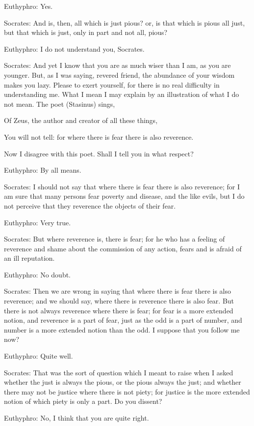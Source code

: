 Euthyphro: Yes.

Socrates: And is, then, all which is just pious? or, is that which is pious all just, but that which is just, only in part and not all, pious?

Euthyphro: I do not understand you, Socrates.

Socrates: And yet I know that you are as much wiser than I am, as you are younger. But, as I was saying, revered friend, the abundance of your wisdom makes you lazy. Please to exert yourself, for there is no real difficulty in understanding me. What I mean I may explain by an illustration of what I do not mean. The poet (Stasinus) sings,

Of Zeus, the author and creator of all these things,

You will not tell: for where there is fear there is also reverence.

Now I disagree with this poet. Shall I tell you in what respect?

Euthyphro: By all means.

Socrates: I should not say that where there is fear there is also reverence; for I am sure that many persons fear poverty and disease, and the like evils, but I do not perceive that they reverence the objects of their fear.

Euthyphro: Very true.

Socrates: But where reverence is, there is fear; for he who has a feeling of reverence and shame about the commission of any action, fears and is afraid of an ill reputation.

Euthyphro: No doubt.

Socrates: Then we are wrong in saying that where there is fear there is also reverence; and we should say, where there is reverence there is also fear. But there is not always reverence where there is fear; for fear is a more extended notion, and reverence is a part of fear, just as the odd is a part of number, and number is a more extended notion than the odd. I suppose that you follow me now?

Euthyphro: Quite well.

Socrates: That was the sort of question which I meant to raise when I asked whether the just is always the pious, or the pious always the just; and whether there may not be justice where there is not piety; for justice is the more extended notion of which piety is only a part. Do you dissent?

Euthyphro: No, I think that you are quite right.

